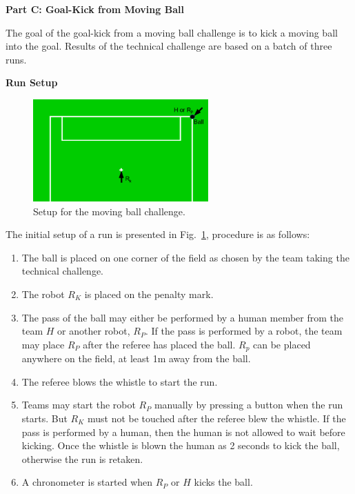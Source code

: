\clearpage
\sffamily
{\bfseries\color[rgb]{0.4,0.4,0.4}
Part C: Goal-Kick from Moving Ball}
{}


\bigskip

The goal of the goal-kick from a moving ball challenge is to kick a moving ball
into the goal. Results of the technical challenge are based on a batch of three runs.

\bigskip

{\bfseries Run Setup}

\smallskip

\begin{figure}[h]
\begin{center}
\includegraphics[width=0.6\textwidth]{img/tc_dynamic_kick.png}
\caption{\label{fig:tc_dynamic_kick}Setup for the moving ball challenge.}
\end{center}
\end{figure}

The initial setup of a run is presented in Fig.~\ref{fig:tc_dynamic_kick},
procedure is as follows:


\begin{enumerate}
\item The ball is placed on one corner of the field as chosen by the team taking the
technical challenge.
\item The robot $R_K$ is placed on the penalty mark.
\item The pass of the ball may either be performed by a human member from the
team $H$ or another robot, $R_P$. If the pass is performed by a robot, the team
may place $R_P$ after the referee has placed the ball. $R_p$ can be placed
anywhere on the field, at least 1m away from the ball.
\item The referee blows the whistle to start the run.
\item Teams may start the robot $R_P$ manually by pressing a button when the
run starts. But $R_K$ must not be touched after the referee blew the whistle. If
the pass is performed by a human, then the human is not allowed to wait before
kicking. Once the whistle is blown the human as 2 seconds to kick the ball,
otherwise the run is retaken.
\item A chronometer is started when $R_P$ or $H$ kicks the ball.
\end{enumerate}

